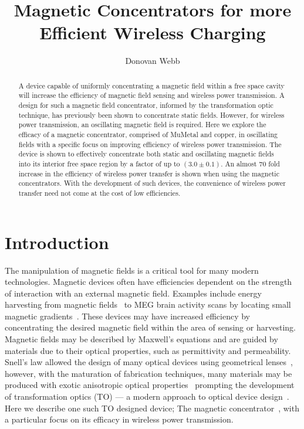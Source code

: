 \documentclass[11pt]{iopart}
\begin{document}
\title[]{Magnetic Concentrators for more Efficient Wireless Charging}

\author{Donovan Webb}

\address{Department of Physics,
University of Bath, Bath BA2 7AY, United Kingdom}

\begin{abstract}

A device capable of uniformly concentrating a magnetic field within a
free space cavity will increase the efficiency of magnetic field
sensing and wireless power transmission.
A design for such a magnetic field concentrator, informed by the
transformation optic technique, has previously been shown to
concentrate static fields.
However, for wireless power transmission, an oscillating magnetic
field is required.
Here we explore the efficacy of a magnetic concentrator, comprised of
MuMetal and copper, in oscillating fields with a specific focus on
improving efficiency of wireless power transmission.
The device is shown to effectively concentrate both static and
oscillating magnetic fields into its interior free space region by a
factor of up to $(3.0\pm0.1)$. An almost $70$ fold increase in the
efficiency of wireless power transfer is shown when using the magnetic
concentrators.
With the development of such devices, the convenience of wireless
power transfer need not come at the cost of low efficiencies.


\end{abstract}
\section{Introduction}

The manipulation of magnetic fields is a critical tool for many modern
technologies. Magnetic devices often have efficiencies dependent on
the strength of interaction with an external magnetic field. Examples
include energy harvesting from magnetic fields~\cite{Hirai2000} to
MEG brain activity scans by locating small magnetic
gradients~\cite{Cohen1968}. These devices may have increased efficiency by
concentrating the desired magnetic field within the area of sensing or
harvesting. \\ Magnetic fields may be described by Maxwell's
equations and are guided by materials due to their
optical properties, such as permittivity and permeability. Snell's law
allowed the design of many optical devices
using geometrical lenses~\cite{Pendry2012}, however, with the maturation
of fabrication techniques, many materials may be produced with exotic
anisotropic optical properties~\cite{Smith2004} prompting the development
of transformation optics (TO) --- a modern approach to optical device
design~\cite{Pendry2006}.\\ Here we describe one such TO designed
device; The magnetic concentrator~\cite{Navau2012}, with a particular
focus on its efficacy in wireless power transmission. \\
\end{document}
